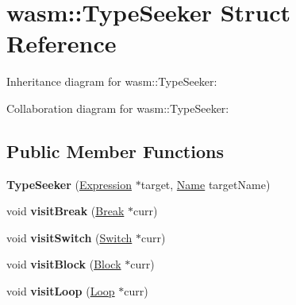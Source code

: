 \hypertarget{structwasm_1_1_type_seeker}{}\section{wasm\+:\+:Type\+Seeker Struct Reference}
\label{structwasm_1_1_type_seeker}


Inheritance diagram for wasm\+:\+:Type\+Seeker\+:


Collaboration diagram for wasm\+:\+:Type\+Seeker\+:
\subsection*{Public Member Functions}
\begin{DoxyCompactItemize}
\item 
\mbox{\label{structwasm_1_1_type_seeker_aec045290cfa1088c291f7d33cabb888c}} 
{\bfseries Type\+Seeker} (\mbox{\hyperlink{classwasm_1_1_expression}{Expression}} $\ast$target, \mbox{\hyperlink{structwasm_1_1_name}{Name}} target\+Name)
\item 
\mbox{\label{structwasm_1_1_type_seeker_a1b7c9269016bd2f5d1eefba88f700a15}} 
void {\bfseries visit\+Break} (\mbox{\hyperlink{classwasm_1_1_break}{Break}} $\ast$curr)
\item 
\mbox{\label{structwasm_1_1_type_seeker_afd8cff3cc32dfc43d7842f4ca7b7a4be}} 
void {\bfseries visit\+Switch} (\mbox{\hyperlink{classwasm_1_1_switch}{Switch}} $\ast$curr)
\item 
\mbox{\label{structwasm_1_1_type_seeker_af19e843c92dbfcd02f7fc52db790872c}} 
void {\bfseries visit\+Block} (\mbox{\hyperlink{classwasm_1_1_block}{Block}} $\ast$curr)
\item 
\mbox{\label{structwasm_1_1_type_seeker_a23a7850fd6049aef0b324e02bcaeefee}} 
void {\bfseries visit\+Loop} (\mbox{\hyperlink{classwasm_1_1_loop}{Loop}} $\ast$curr)
\end{DoxyCompactItemize}
